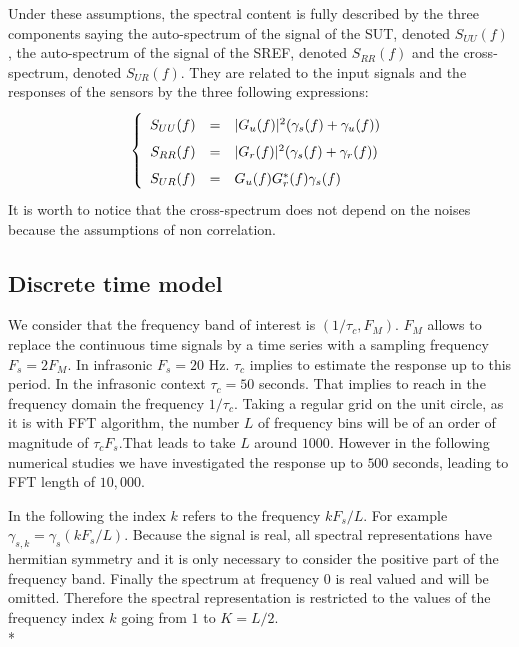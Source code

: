 Under these assumptions, the spectral content is fully described by the three components saying the  auto-spectrum of the signal of the SUT, denoted $S_{UU}(f)$, the auto-spectrum of the signal of the SREF, denoted  $S_{RR}(f)$ and the  cross-spectrum, denoted $S_{UR}(f)$. They are related to the input signals and the responses of the sensors by the three following expressions:
\begin{eqnarray}
\label{eq:spectral-model}
\left\{
\renewcommand\arraystretch{1.6}
\begin{array}{rcl}
S_{UU}(f)&=&|G_{\ut}(f)|^{2} (\gamma_{s}(f)+\gamma_{\ut}(f))
\\
S_{RR}(f)&=&|G_{\rf}(f)|^{2} (\gamma_{s}(f)+\gamma_{\rf}(f))
\\
S_{UR}(f)&=&G_{\ut}(f)G^{*}_{\rf}(f)\gamma_{s}(f)
\end{array}
\right.
\end{eqnarray}
It is worth to notice that the cross-spectrum does not depend on the noises because the assumptions of non correlation.


\subsection{Discrete time model}
We consider that the frequency band of interest is $(1/\tau_{c}, F_{M})$. $F_{M}$ allows to replace the continuous time signals by a time series with a sampling frequency $F_{s}=2F_{M}$. In infrasonic $F_{s}=20$ Hz. $\tau_{c}$ implies to estimate the response up to this period. In the infrasonic context $\tau_{c}=50$ seconds. That implies to reach in the  frequency domain the frequency  $1/\tau_{c}$. Taking a regular grid on the unit circle, as it is with FFT algorithm, the number $L$ of frequency bins will be of an order of magnitude of $\tau_{c}F_{s}$.That leads to take $L$ around $1000$. However in the following numerical studies we have investigated the response up to $500$ seconds, leading to FFT length of $10,\!000$.

 In the following the index $k$ refers to the frequency $kF_{s}/L$. For example $\gamma_{s,k}=\gamma_{s}(kF_{s}/L)$. Because the signal is real, all spectral representations have hermitian symmetry and it is only necessary to consider the positive part of the frequency band. Finally the spectrum at frequency 0 is real valued and will be omitted. Therefore the spectral representation is restricted to the values of the frequency index $k$ going from $1$ to $K=L/2$. \\*

